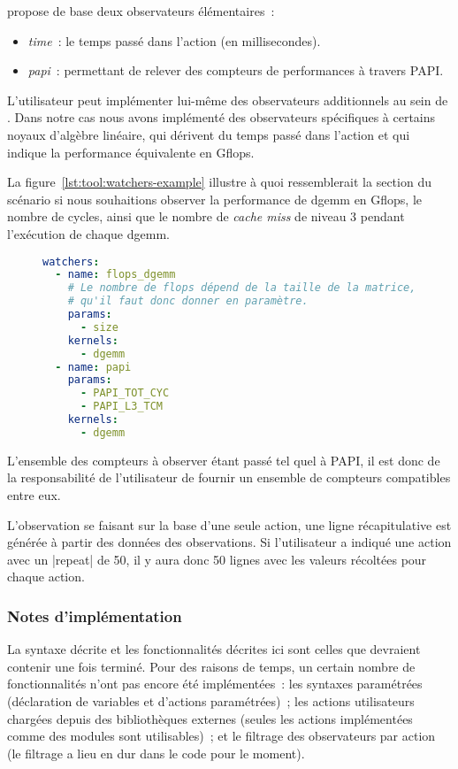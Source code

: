 \outil propose de base deux observateurs élémentaires~:

\begin{itemize}
  \item \emph{time}~: le temps passé dans l'action (en millisecondes).
  \item \emph{papi}~: permettant de relever des compteurs de performances à travers PAPI.
\end{itemize}

L'utilisateur peut implémenter lui-même des observateurs additionnels au sein de \outil.
Dans notre cas nous avons implémenté des observateurs spécifiques à certains noyaux d'algèbre linéaire, qui dérivent du temps passé dans l'action et qui indique la performance équivalente en Gflops.

La figure~\ref{lst:tool:watchers-example} illustre à quoi ressemblerait la section du scénario si nous souhaitions observer la performance de dgemm en Gflops, le nombre de cycles, ainsi que le nombre de \emph{cache miss} de niveau 3 pendant l'exécution de chaque dgemm.

\begin{figure}[h!]
\begin{lstlisting}[language=yaml,caption=Exemple de déclaration d'observateurs,label=lst:tool:watchers-example]
watchers:
  - name: flops_dgemm
    # Le nombre de flops dépend de la taille de la matrice,
    # qu'il faut donc donner en paramètre.
    params:
      - size
    kernels:
      - dgemm
  - name: papi
    params:
      - PAPI_TOT_CYC
      - PAPI_L3_TCM
    kernels:
      - dgemm
\end{lstlisting}
\end{figure}

L'ensemble des compteurs à observer étant passé tel quel à PAPI, il est donc de la responsabilité de l'utilisateur de fournir un ensemble de compteurs compatibles entre eux.

L'observation se faisant sur la base d'une seule action, une ligne récapitulative est générée à partir des données des observations.
Si l'utilisateur a indiqué une action avec un |repeat| de 50, il y aura donc 50 lignes avec les valeurs récoltées pour chaque action.

\subsubsection{Notes d'implémentation}

La syntaxe décrite et les fonctionnalités décrites ici sont celles que devraient contenir \outil une fois terminé.
Pour des raisons de temps, un certain nombre de fonctionnalités n'ont pas encore été implémentées~: les syntaxes paramétrées (déclaration de variables et d'actions paramétrées)~; les actions utilisateurs chargées depuis des bibliothèques externes (seules les actions implémentées comme des modules sont utilisables)~; et le filtrage des observateurs par action (le filtrage a lieu en dur dans le code pour le moment).


